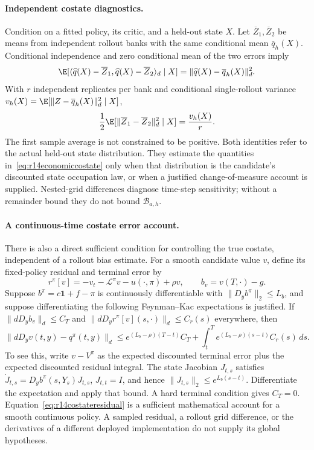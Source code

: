 \paragraph*{Independent costate diagnostics.}
Condition on a fitted policy, its critic, and a held-out state $X$.
Let $\overline Z_1,\overline Z_2$ be means from independent rollout
banks with the same conditional mean $\overline q_h(X)$. Conditional
independence and zero conditional mean of the two errors imply
\[
 \E[\langle\widehat q(X)-\overline Z_1,
                  \widehat q(X)-\overline Z_2\rangle_d\mid X]
       =\|\widehat q(X)-\overline q_h(X)\|_d^2.
\]
With $r$ independent replicates per bank and conditional single-rollout
variance $v_h(X)=\E[\|Z-\overline q_h(X)\|_d^2\mid X]$,
\[
 \frac12\E[\|\overline Z_1-\overline Z_2\|_d^2\mid X]
       =\frac{v_h(X)}r.
\]
The first sample average is not constrained to be positive. Both
identities refer to the actual held-out state distribution. They
estimate the quantities in~\eqref{eq:r14economiccostate} only when
that distribution is the candidate's discounted state occupation law,
or when a justified change-of-measure account is supplied. Nested-grid
differences diagnose time-step sensitivity; without a remainder bound
they do not bound $\mathcal B_{a,h}$.

\paragraph*{A continuous-time costate error account.}
There is also a direct sufficient condition for controlling the true
costate, independent of a rollout bias estimate. For a smooth candidate
value $v$, define its fixed-policy residual and terminal error by
\[
 r^\pi[v]=-v_t-\mathcal L^\pi v-u(\cdot,\pi)+\rho v,
 \qquad b_v=v(T,\cdot)-g.
\]
Suppose $b^\pi=c\bm1+f-\pi$ is continuously differentiable with
$\|D_yb^\pi\|_2\leq L_b$, and suppose differentiating the following
Feynman--Kac expectations is justified. If
$\|dD_yb_v\|_d\leq C_T$ and
$\|dD_yr^\pi[v](s,\cdot)\|_d\leq C_r(s)$ everywhere, then
\begin{equation}\label{eq:r14costateresidual}
 \|dD_yv(t,y)-q^\pi(t,y)\|_d
 \leq e^{(L_b-\rho)(T-t)}C_T
       +\int_t^T e^{(L_b-\rho)(s-t)}C_r(s)\,ds.
\end{equation}
To see this, write $v-V^\pi$ as the expected discounted terminal error
plus the expected discounted residual integral. The state Jacobian
$J_{t,s}$ satisfies
$\dot J_{t,s}=D_yb^\pi(s,Y_s)J_{t,s}$, $J_{t,t}=I$, and hence
$\|J_{t,s}\|_2\leq e^{L_b(s-t)}$. Differentiate the expectation and
apply that bound. A hard terminal condition gives $C_T=0$.
Equation~\eqref{eq:r14costateresidual} is a sufficient mathematical
account for a smooth continuous policy. A sampled residual, a rollout
grid difference, or the derivatives of a different deployed
implementation do not supply its global hypotheses.
